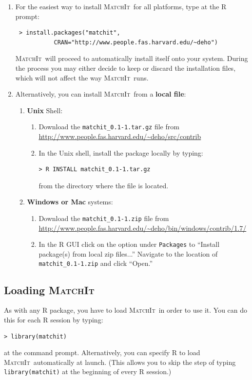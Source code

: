 \documentclass[oneside,letterpaper,titlepage]{article}
\newcommand{\MatchIt}{\textsc{MatchIt}}
\begin{document}
\begin{enumerate} 
\item For the easiest way to install \MatchIt\ for all platforms,
  type at the R prompt:
\begin{verbatim}
 > install.packages("matchit", 
           CRAN="http://www.people.fas.harvard.edu/~deho")
\end{verbatim}

  \noindent \MatchIt\ will proceed to automatically install itself onto
  your system.  During the process you may either decide to keep or
  discard the installation files, which will not affect the way
  \MatchIt\ runs.

\item Alternatively, you can install \MatchIt\ from a \textbf{local file}:
  \begin{enumerate} 
  \item \textbf{Unix} Shell:
    \begin{enumerate}
    \item Download the \texttt{matchit\_0.1-1.tar.gz} file from
      \url{http://www.people.fas.harvard.edu/~deho/src/contrib}
    \item In the Unix shell, install the package locally by typing:
\begin{verbatim}
> R INSTALL matchit_0.1-1.tar.gz   
\end{verbatim}
      from the directory where the file is located.
    \end{enumerate}
  \item \textbf{Windows or Mac} systems:
    \begin{enumerate}
    \item Download the \texttt{matchit\_0.1-1.zip} file from 
      \url{http://www.people.fas.harvard.edu/~deho/bin/windows/contrib/1.7/}
    \item In the R GUI click on the option under \texttt{Packages}
      to ``Install package(s) from local zip files...''
      Navigate to the location of \texttt{matchit\_0.1-1.zip} and click ``Open.''
    \end{enumerate}
  \end{enumerate}
\end{enumerate}

\subsection{Loading \MatchIt}
As with any R package, you have to load \MatchIt\ in order to use it.
You can do this for each R session by typing:
\begin{verbatim}
> library(matchit) 
\end{verbatim}
at the command prompt.  Alternatively, you can specify R to load
\MatchIt\ automatically at launch.  (This allows you to skip the step
of typing {\tt library(matchit)} at the beginning of every R session.)
 
\end{document}
